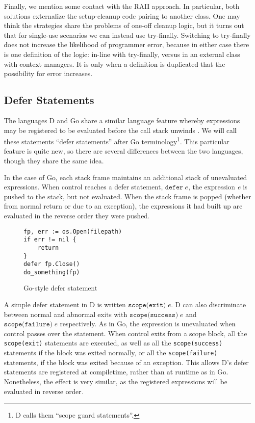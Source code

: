 \documentclass[11pt]{article}
\newcommand{\maybePage}{\newpage}
\begin{document}
Finally, we mention some contact with the RAII approach.
In particular, both solutions externalize the setup-cleanup code pairing to another class.
One may think the strategies share the problems of one-off cleanup logic, but it turns out that for single-use scenarios we can instead use try-finally.
Switching to try-finally does not increase the likelihood of programmer error, because in either case there is one definition of the logic: in-line with try-finally, versus in an external class with context managers.
It is only when a definition is duplicated that the possibility for error increases.


\maybePage
\subsection{Defer Statements}
\label{defer}

The languages D and Go share a similar language feature whereby expressions may be registered to be evaluated before the call stack unwinds \cite{DReference}\cite{GoLanguage}. We will call these statements ``defer statements'' after Go terminology\footnote{D calls them ``scope guard statements''.}. This particular feature is quite new, so there are several differences between the two languages, though they share the same idea.

In the case of Go, each stack frame maintains an additional stack of unevaluated expressions. When control reaches a defer statement, $\texttt{defer}\;e$, the expression \textit{e} is pushed to the stack, but not evaluated. When the stack frame is popped (whether from normal return or due to an exception), the expressions it had built up are evaluated in the reverse order they were pushed.

\begin{figure}[H]
\caption{Go-style defer statement}
\label{goDeferStatement}
\begin{verbatim}
fp, err := os.Open(filepath)
if err != nil {
    return
}
defer fp.Close()
do_something(fp)
\end{verbatim}
\end{figure}

A simple defer statement in D is written $\texttt{scope(exit)}\;e$.
D can also discriminate between normal and abnormal exits with $\texttt{scope(success)}\;e$ and $\texttt{scope(failure)}\;e$ respectively.
As in Go, the expression is unevaluated when control passes over the statement.
When control exits from a scope block, all the \texttt{scope(exit)} statements are executed, as well as all the \texttt{scope(success)} statements if the block was exited normally, or all the \texttt{scope(failure)} statements, if the block was exited because of an exception.
This allows D's defer statements are registered at compiletime, rather than at runtime as in Go.
Nonetheless, the effect is very similar, as the registered expressions will be evaluated in reverse order.
\end{document}
